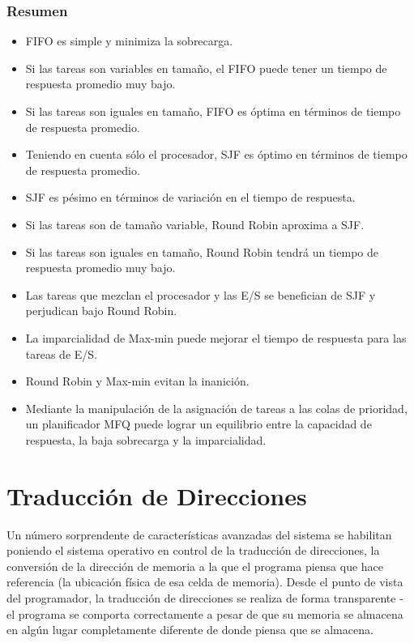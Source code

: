 \documentclass[10pt]{book}
\begin{document}
\subsection{Resumen}
\begin{itemize}
\item FIFO es simple y minimiza la sobrecarga.
\item Si las tareas son variables en tamaño, el FIFO puede tener un tiempo de respuesta promedio muy bajo.
\item Si las tareas son iguales en tamaño, FIFO es óptima en términos de tiempo de respuesta promedio.
\item Teniendo en cuenta sólo el procesador, SJF es óptimo en términos de tiempo de respuesta promedio.
\item SJF es pésimo en términos de variación en el tiempo de respuesta.
\item Si las tareas son de tamaño variable, Round Robin aproxima a SJF.
\item Si las tareas son iguales en tamaño, Round Robin tendrá un tiempo de respuesta promedio muy bajo.
\item Las tareas que mezclan el procesador y las E/S se benefician de SJF y perjudican bajo Round Robin.
\item La imparcialidad de Max-min puede mejorar el tiempo de respuesta para las tareas de E/S.
\item Round Robin y Max-min evitan la inanición.
\item Mediante la manipulación de la asignación de tareas a las colas de prioridad, un planificador MFQ puede lograr un equilibrio entre la capacidad de respuesta, la baja sobrecarga y la imparcialidad.
\end{itemize}

\chapter{Traducción de Direcciones}
Un número sorprendente de características avanzadas del sistema se habilitan poniendo el sistema operativo en control de la traducción de direcciones, la conversión de la dirección de memoria a la que el programa piensa que hace referencia (la ubicación física de esa celda de memoria). Desde el punto de vista del programador, la traducción de direcciones se realiza de forma transparente - el programa se comporta correctamente a pesar de que su memoria se almacena en algún lugar completamente diferente de donde piensa que se almacena.
\end{document}
